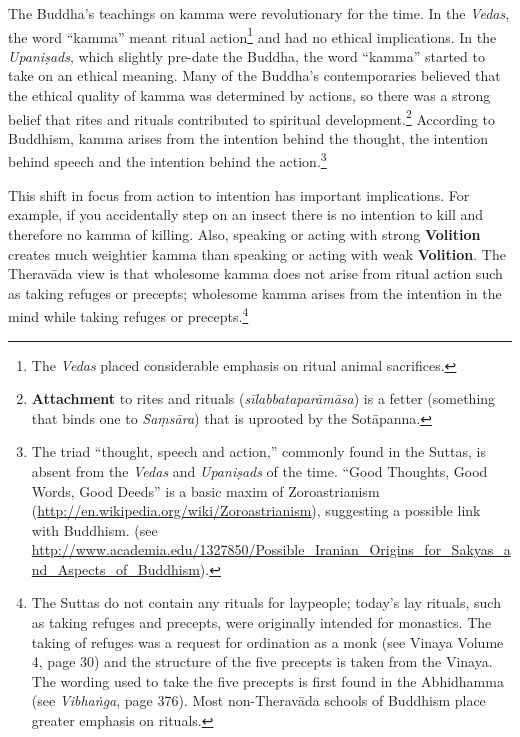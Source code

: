 The Buddha’s teachings on kamma were revolutionary for the time. In the \textit{Vedas}, the word “kamma” meant ritual action\footnote{The \textit{Vedas} placed considerable emphasis on ritual animal sacrifices.} and had no ethical implications. In the \textit{Upaniṣads}, which slightly pre-date the Buddha, the word “kamma” started to take on an ethical meaning. Many of the Buddha’s contemporaries believed that the ethical quality of kamma was determined by actions, so there was a strong belief that rites and rituals contributed to spiritual development.\footnote{\textbf{Attachment} to rites and rituals (\textit{sīlabbataparāmāsa}) is a fetter (something that binds one to \textit{Saṃsāra}) that is uprooted by the Sotāpanna.} According to Buddhism, kamma arises from the intention behind the thought, the intention behind speech and the intention behind the action.\footnote{The triad “thought, speech and action,” commonly found in the Suttas, is absent from the \textit{Vedas} and \textit{Upaniṣads} of the time. “Good Thoughts, Good Words, Good Deeds” is a basic maxim of Zoroastrianism (\url{http://en.wikipedia.org/wiki/Zoroastrianism}), suggesting a possible link with Buddhism. (see\\
\url{http://www.academia.edu/1327850/Possible_Iranian_Origins_for_Sakyas_and_Aspects_of_Buddhism}).}

\pagebreak

This shift in focus from action to intention has important implications. For example, if you accidentally step on an insect there is no intention to kill and therefore no kamma of killing. Also, speaking or acting with strong \textbf{Volition} creates much weightier kamma than speaking or acting with weak \textbf{Volition}. The Theravāda view is that wholesome kamma does not arise from ritual action such as taking refuges or precepts; wholesome kamma arises from the intention in the mind while taking refuges or precepts.\footnote{The Suttas do not contain any rituals for laypeople; today’s lay rituals, such as taking refuges and precepts, were originally intended for monastics. The taking of refuges was a request for ordination as a monk (see Vinaya Volume 4, page 30) and the structure of the five precepts is taken from the Vinaya. The wording used to take the five precepts is first found in the Abhidhamma (see \textit{Vibhaṅga}, page 376). Most non-Theravāda schools of Buddhism place greater emphasis on rituals.}

